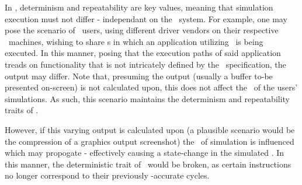In \termsimics , determinism and repeatability are key values, meaning that simulation execution must not differ - independant on the \termhost\ system.
For example, one may pose the scenario of \termsimics\ users, using different driver vendors on their respective \termhost\ machines, wishing to share \termcheckpoint s in which an application utilizing \termopengles\ is being executed.
In this manner, posing that the execution paths of said application treads on functionality that is not intricately defined by the \termopengles\ specification, the output may differ.
Note that, presuming the output (usually a buffer to-be presented on-screen) is not calculated upon, this does not affect the \termtiming\ of the users' simulations.
As such, this scenario maintains the determinism and repeatability traits of \termsimics .

However, if this varying output is calculated upon (a plausible scenario would be the compression of a graphics output screenshot) the \termtiming\ of simulation is influenced which may propogate - effectively causing a state-change in the simulated \termcpu .
In this manner, the deterministic trait of \termsimics\ would be broken, as certain instructions no longer correspond to their previously \termtiming -accurate cycles.
